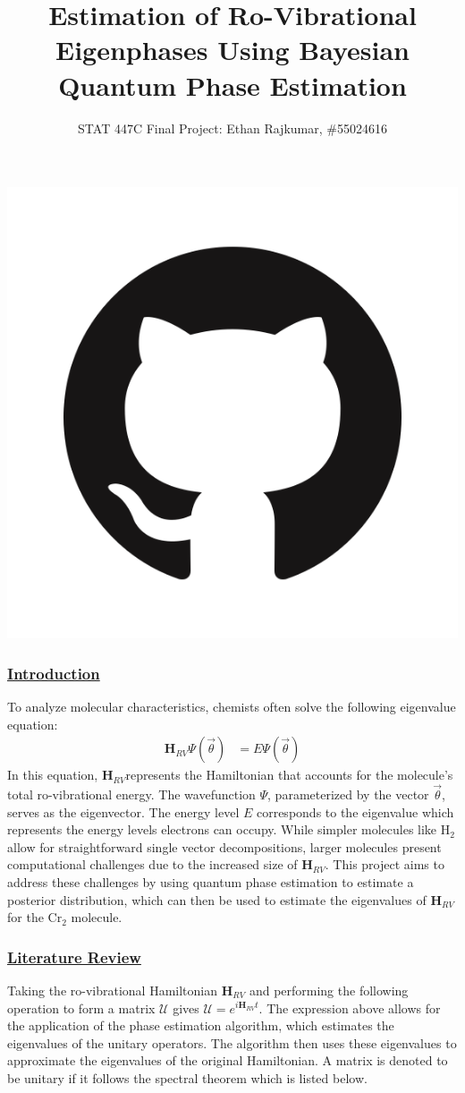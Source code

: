 \documentclass[
]{article}
\title{Estimation of Ro-Vibrational Eigenphases Using Bayesian Quantum
Phase Estimation}
\subtitle{STAT 447C Final Project: Ethan Rajkumar, \#55024616}
\author{}
\date{\vspace{-2.5em}}
\newcommand{\githublogo}{
  \noindent\href{https://github.com/ethraj2001/STAT447C_Bayesian_DVR_QPE}{
    \includegraphics[scale=4]{tex/github.png}}
}
\begin{document}
\maketitle

\vspace{-1.5cm}
\maketitle
\begin{center}
\githublogo
\end{center}

\subsubsection*{\texorpdfstring{\underline{Introduction}}{}}\label{section}

\vspace{-0.5cm}

To analyze molecular characteristics, chemists often solve the following
eigenvalue equation: \begin{align}
    \mathbf{H}_{RV} \Psi(\vec{\theta}) &= E \Psi(\vec{\theta})
\end{align} In this equation, \(\mathbf{H}_{RV}\)represents the
Hamiltonian that accounts for the molecule's total ro-vibrational
energy. The wavefunction \(\Psi\), parameterized by the vector
\(\vec{\theta}\), serves as the eigenvector. The energy level \(E\)
corresponds to the eigenvalue which represents the energy levels
electrons can occupy. While simpler molecules like H\(_{2}\) allow for
straightforward single vector decompositions, larger molecules present
computational challenges due to the increased size of
\(\mathbf{H}_{RV}\). This project aims to address these challenges by
using quantum phase estimation to estimate a posterior distribution,
which can then be used to estimate the eigenvalues of
\(\mathbf{H}_{RV}\) for the Cr\(_2\) molecule. \vspace{-0.5cm}

\subsubsection*{\texorpdfstring{\underline{Literature Review}}{}}\label{section-1}

\vspace{-0.5cm}

Taking the ro-vibrational Hamiltonian \(\mathbf{H}_{RV}\) and performing
the following operation to form a matrix \(\mathcal{U}\) gives
\(\mathcal{U} = e^{i \mathbf{H}_{RV} t}\). The expression above allows
for the application of the phase estimation algorithm, which estimates
the eigenvalues of the unitary operators. The algorithm then uses these
eigenvalues to approximate the eigenvalues of the original Hamiltonian.
A matrix is denoted to be unitary if it follows the spectral theorem
which is listed below. \vspace{-0.1cm}
\end{document}
